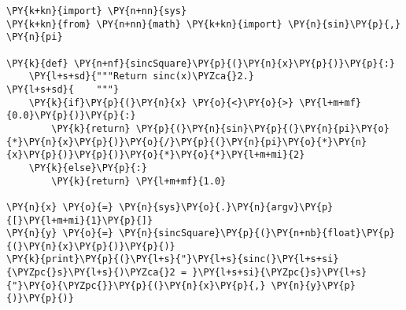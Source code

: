 \begin{Verbatim}[commandchars=\\\{\}]
\PY{k+kn}{import} \PY{n+nn}{sys}
\PY{k+kn}{from} \PY{n+nn}{math} \PY{k+kn}{import} \PY{n}{sin}\PY{p}{,} \PY{n}{pi}

\PY{k}{def} \PY{n+nf}{sincSquare}\PY{p}{(}\PY{n}{x}\PY{p}{)}\PY{p}{:}
    \PY{l+s+sd}{"""Return sinc(x)\PYZca{}2.}
\PY{l+s+sd}{    """}
    \PY{k}{if}\PY{p}{(}\PY{n}{x} \PY{o}{<}\PY{o}{>} \PY{l+m+mf}{0.0}\PY{p}{)}\PY{p}{:}
        \PY{k}{return} \PY{p}{(}\PY{n}{sin}\PY{p}{(}\PY{n}{pi}\PY{o}{*}\PY{n}{x}\PY{p}{)}\PY{o}{/}\PY{p}{(}\PY{n}{pi}\PY{o}{*}\PY{n}{x}\PY{p}{)}\PY{p}{)}\PY{o}{*}\PY{o}{*}\PY{l+m+mi}{2}
    \PY{k}{else}\PY{p}{:}
        \PY{k}{return} \PY{l+m+mf}{1.0}

\PY{n}{x} \PY{o}{=} \PY{n}{sys}\PY{o}{.}\PY{n}{argv}\PY{p}{[}\PY{l+m+mi}{1}\PY{p}{]}
\PY{n}{y} \PY{o}{=} \PY{n}{sincSquare}\PY{p}{(}\PY{n+nb}{float}\PY{p}{(}\PY{n}{x}\PY{p}{)}\PY{p}{)}
\PY{k}{print}\PY{p}{(}\PY{l+s}{"}\PY{l+s}{sinc(}\PY{l+s+si}{\PYZpc{}s}\PY{l+s}{)\PYZca{}2 = }\PY{l+s+si}{\PYZpc{}s}\PY{l+s}{"}\PY{o}{\PYZpc{}}\PY{p}{(}\PY{n}{x}\PY{p}{,} \PY{n}{y}\PY{p}{)}\PY{p}{)}
\end{Verbatim}
